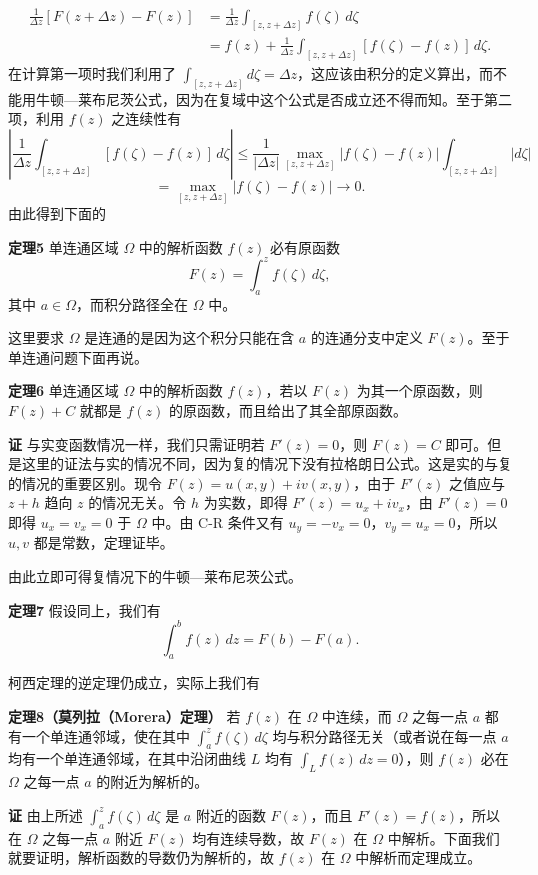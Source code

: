 \[
\begin{aligned}
 \frac1{\Delta z}[F(z+\Delta z)-F(z)]
 &=\frac1{\Delta z}\int_{[z,z+\Delta z]}f(\zeta)\,d\zeta\\
 &=f(z)+\frac1{\Delta z}\int_{[z,z+\Delta z]}[f(\zeta)-f(z)]\,d\zeta.
\end{aligned}
\]
在计算第一项时我们利用了 $\int_{[z,z+\Delta z]}d\zeta=\Delta z$，这应该由积分的定义算出，而不能用牛顿—莱布尼茨公式，因为在复域中这个公式是否成立还不得而知。至于第二项，利用 $f(z)$ 之连续性有
\[
 \left|\frac1{\Delta z}\int_{[z,z+\Delta z]}[f(\zeta)-f(z)]\,d\zeta\right|
 \le\frac1{|\Delta z|}\max_{[z,z+\Delta z]}|f(\zeta)-f(z)|
 \int_{[z,z+\Delta z]}|d\zeta|
\]
\[
 =\max_{[z,z+\Delta z]}|f(\zeta)-f(z)|\to0.
\]
由此得到下面的

\noindent\textbf{定理5}
单连通区域 $\Omega$ 中的解析函数 $f(z)$ 必有原函数
\[
 F(z)=\int_a^z f(\zeta)\,d\zeta,
\]
其中 $a\in\Omega$，而积分路径全在 $\Omega$ 中。

这里要求 $\Omega$ 是连通的是因为这个积分只能在含 $a$ 的连通分支中定义 $F(z)$。至于单连通问题下面再说。

\noindent\textbf{定理6}
单连通区域 $\Omega$ 中的解析函数 $f(z)$，若以 $F(z)$ 为其一个原函数，则 $F(z)+C$ 就都是 $f(z)$ 的原函数，而且给出了其全部原函数。

\noindent\textbf{证}
与实变函数情况一样，我们只需证明若 $F'(z)=0$，则 $F(z)=C$ 即可。但是这里的证法与实的情况不同，因为复的情况下没有拉格朗日公式。这是实的与复的情况的重要区别。现令 $F(z)=u(x,y)+iv(x,y)$，由于 $F'(z)$ 之值应与 $z+h$ 趋向 $z$ 的情况无关。令 $h$ 为实数，即得 $F'(z)=u_x+iv_x$，由 $F'(z)=0$ 即得 $u_x=v_x=0$ 于 $\Omega$ 中。由 C-R 条件又有 $u_y=-v_x=0$，$v_y=u_x=0$，所以 $u,v$ 都是常数，定理证毕。

由此立即可得复情况下的牛顿—莱布尼茨公式。

\noindent\textbf{定理7}
假设同上，我们有
\[
 \int_a^b f(z)\,dz=F(b)-F(a).
\]

柯西定理的逆定理仍成立，实际上我们有

\noindent\textbf{定理8（莫列拉（Morera）定理）}
若 $f(z)$ 在 $\Omega$ 中连续，而 $\Omega$ 之每一点 $a$ 都有一个单连通邻域，使在其中 $\int_a^z f(\zeta)\,d\zeta$ 均与积分路径无关（或者说在每一点 $a$ 均有一个单连通邻域，在其中沿闭曲线 $L$ 均有 $\int_Lf(z)\,dz=0$），则 $f(z)$ 必在 $\Omega$ 之每一点 $a$ 的附近为解析的。

\noindent\textbf{证}
由上所述 $\int_a^z f(\zeta)\,d\zeta$ 是 $a$ 附近的函数 $F(z)$，而且 $F'(z)=f(z)$，所以在 $\Omega$ 之每一点 $a$ 附近 $F(z)$ 均有连续导数，故 $F(z)$ 在 $\Omega$ 中解析。下面我们就要证明，解析函数的导数仍为解析的，故 $f(z)$ 在 $\Omega$ 中解析而定理成立。

